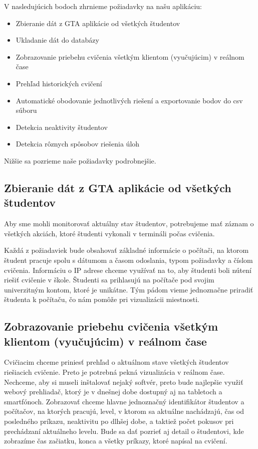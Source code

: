 V nasledujúcich bodoch zhrnieme požiadavky na našu aplikáciu:

\begin{itemize}
	\item Zbieranie dát z GTA aplikácie od všetkých študentov
	\item Ukladanie dát do databázy
	\item Zobrazovanie priebehu cvičenia všetkým klientom (vyučujúcim) v reálnom čase
	\item Prehľad historických cvičení
	\item Automatické obodovanie jednotlivých riešení a exportovanie bodov do csv súboru
	\item Detekcia neaktivity študentov
	\item Detekcia rôznych spôsobov riešenia úloh
\end{itemize}

Nižšie sa pozrieme naše požiadavky podrobnejšie.

\subsection{Zbieranie dát z GTA aplikácie od všetkých študentov}
\label{sec:apprequirements:gtadata}

Aby sme mohli monitorovať aktuálny stav študentov, potrebujeme mať záznam o
všetkých akciách, ktoré študenti vykonali v termináli počas cvičenia.

Každá z požiadaviek bude obsahovať základné informácie o počítači, na ktorom
študent pracuje spolu s dátumom a časom odoslania, typom požiadavky a číslom cvičenia.
Informáciu o IP adrese chceme využívať na to, aby študenti boli nútení
riešiť cvičenie v škole.
Študenti sa prihlasujú na počítače pod svojim univerzitným kontom, ktoré je unikátne.
Tým pádom vieme jednoznačne priradiť študenta k počítaču, čo nám pomôže pri
vizualizácii miestnosti.


\subsection{Zobrazovanie priebehu cvičenia všetkým klientom (vyučujúcim) v reálnom čase}
\label{sec:apprequirements:visualization}

Cvičiacim chceme priniesť prehľad o aktuálnom stave všetkých študentov riešiacich
cvičenie. Preto je potrebná pekná vizualizácia v reálnom čase.
Nechceme, aby si museli inštalovať nejaký softvér, preto bude najlepšie využiť webový prehliadač, ktorý je v dnešnej dobe dostupný aj na tabletoch a smartfónoch.
Zobrazovať chceme hlavne jednoznačný identifikátor študentov a počítačov, na ktorých
pracujú, level, v ktorom
sa aktuálne nachádzajú, čas od posledného príkazu, neaktivitu po dlhšej dobe,
a taktiež počet pokusov pri prechádzaní aktuálneho levelu. Bude sa dať pozrieť
aj detail o študentovi, kde zobrazíme čas začiatku, konca a všetky príkazy, ktoré
napísal na cvičení.

